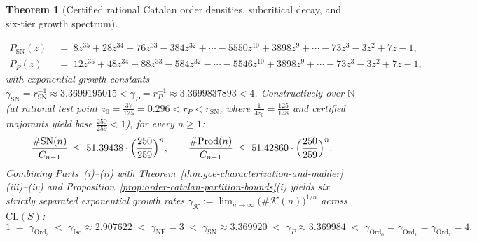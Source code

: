 \documentclass[11pt,reqno]{amsart}
\numberwithin{equation}{section}
\theoremstyle{plain}
\newtheorem{theorem}{Theorem}[section]
\theoremstyle{definition}
\theoremstyle{remark}
\newcommand{\CLS}{\mathrm{CL}(S)}
\newcommand{\NF}{\mathrm{NF}}
\newcommand{\SN}{\mathrm{SN}}
\newcommand{\Prod}{\mathrm{Prod}}
\begin{document}
\begin{theorem}[Certified rational Catalan order densities, subcritical decay, and six-tier growth spectrum]
\begin{enumerate}[label=(\roman*),leftmargin=2.2em]
\begin{align*}
P_{\SN}(z) &\;=\; 8 z^{35} + 28 z^{34} - 76 z^{33} - 384 z^{32} + \cdots - 5550 z^{10} + 3898 z^9 + \cdots - 73 z^3 - 3 z^2 + 7 z - 1, \\
P_P(z) &\;=\; 12 z^{35} + 48 z^{34} - 88 z^{33} - 584 z^{32} - \cdots - 5546 z^{10} + 3898 z^9 + \cdots - 73 z^3 - 3 z^2 + 7 z - 1,
\end{align*}
with exponential growth constants $\gamma_{\SN} = r_{\SN}^{-1} \approx 3.3699195015 < \gamma_P = r_P^{-1} \approx 3.3699837893 < 4$. Constructively over $\mathbb{N}$ (at rational test point $z_0 = \frac{37}{125} = 0.296 < r_P < r_{\SN}$, where $\frac{1}{4 z_0} = \frac{125}{148}$ and certified majorants yield base $\frac{250}{259} < 1$), for every $n \ge 1$:
\begin{equation}
\label{eq:sn-prod-exp-decay}
\frac{\#\SN(n)}{C_{n-1}} \;\le\; 51.39438 \cdot \Bigl(\frac{250}{259}\Bigr)^n,
\qquad
\frac{\#\Prod(n)}{C_{n-1}} \;\le\; 51.42860 \cdot \Bigl(\frac{250}{259}\Bigr)^n.
\end{equation}
Combining Parts~(i)--(ii) with Theorem~\ref{thm:goe-characterization-and-mahler}(iii)--(iv) and Proposition~\ref{prop:order-catalan-partition-bounds}(i) yields six strictly separated exponential growth rates $\gamma_{\mathcal{K}} := \lim_{n \to \infty} \bigl(\#\mathcal{K}(n)\bigr)^{1/n}$ across $\CLS$:
\begin{equation}
\label{eq:six-tier-growth}
1 \;=\; \gamma_{\mathrm{Ord}_3}
\;<\; \gamma_{\mathrm{Iso}} \approx 2.907622
\;<\; \gamma_{\NF} = 3
\;<\; \gamma_{\SN} \approx 3.369920
\;<\; \gamma_P \approx 3.369984
\;<\; \gamma_{\mathrm{Ord}_0} = \gamma_{\mathrm{Ord}_1} = \gamma_{\mathrm{Ord}_2} = 4.
\end{equation}
\end{enumerate}
\end{theorem}
\end{document}
